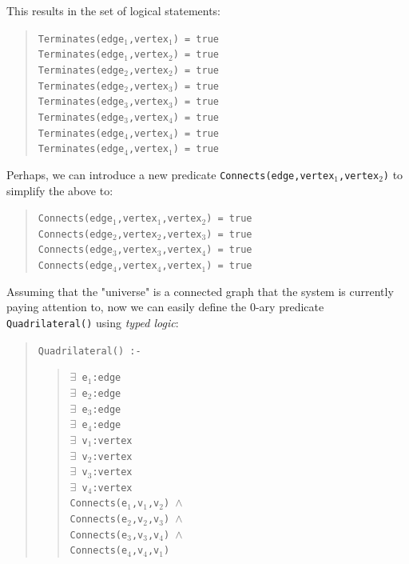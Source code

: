 This results in the set of logical statements:
\begin{quote}

\texttt{Terminates(edge$_1$,vertex$_1$) = true
\\
    Terminates(edge$_1$,vertex$_2$) = true
\\
    Terminates(edge$_2$,vertex$_2$) = true 
\\
    Terminates(edge$_2$,vertex$_3$) = true 
\\
    Terminates(edge$_3$,vertex$_3$) = true
\\
    Terminates(edge$_3$,vertex$_4$) = true 
\\
    Terminates(edge$_4$,vertex$_4$) = true 
\\
    Terminates(edge$_4$,vertex$_1$) = true
  }
\end{quote}

Perhaps, we can introduce a new predicate \texttt{Connects(edge,vertex$_1$,vertex$_2$)} to simplify the above to:
\begin{quote}

\texttt{Connects(edge$_1$,vertex$_1$,vertex$_2$) = true
\\
    Connects(edge$_2$,vertex$_2$,vertex$_3$) = true
\\
    Connects(edge$_3$,vertex$_3$,vertex$_4$) = true
\\
    Connects(edge$_4$,vertex$_4$,vertex$_1$) = true}
\end{quote}

Assuming that the "universe"  is a connected graph that the system is currently paying attention to, now we can easily define the 0-ary predicate \texttt{Quadrilateral()} using \emph{typed logic}:
\begin{quote}

\texttt{Quadrilateral() :-}
\begin{quote}

\texttt{$\exists $ e$_1$:edge
\\
      $\exists $ e$_2$:edge
\\
      $\exists $ e$_3$:edge
\\
      $\exists $ e$_4$:edge
\\
      $\exists $ v$_1$:vertex
\\
      $\exists $ v$_2$:vertex
\\
      $\exists $ v$_3$:vertex
\\
      $\exists $ v$_4$:vertex
\\
      Connects(e$_1$,v$_1$,v$_2$) $\wedge$
\\
      Connects(e$_2$,v$_2$,v$_3$) $\wedge$
\\
      Connects(e$_3$,v$_3$,v$_4$) $\wedge$
\\
    Connects(e$_4$,v$_4$,v$_1$)}
\end{quote}
\end{quote}

